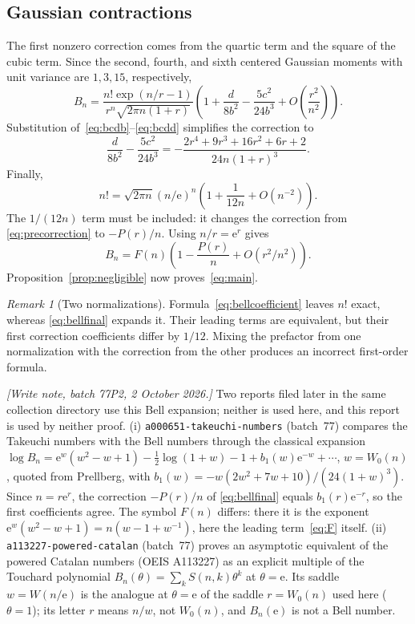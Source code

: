 \documentclass[11pt,a4paper]{article}
\numberwithin{equation}{section}
\theoremstyle{remark}
\newtheorem{remark}[theorem]{Remark}
\newcommand{\e}{\mathrm e}
\begin{document}
\subsection{Gaussian contractions}
The first nonzero correction comes from the quartic term and the square
of the cubic term. Since the second, fourth, and sixth centered Gaussian
moments with unit variance are $1,3,15$, respectively,
\begin{equation}\label{eq:bellcoefficient}
 B_n=\frac{n!\exp(n/r-1)}{r^n\sqrt{2\pi n(1+r)}}
 \left(1+\frac d{8b^2}-\frac{5c^2}{24b^3}
       +O\!\left(\frac{r^2}{n^2}\right)\right).
\end{equation}
Substitution of~\eqref{eq:bcdb}--\eqref{eq:bcdd} simplifies the correction to
\begin{equation}\label{eq:precorrection}
 \frac d{8b^2}-\frac{5c^2}{24b^3}
 =-\frac{2r^4+9r^3+16r^2+6r+2}{24n(1+r)^3}.
\end{equation}
Finally,
\[
 n!=\sqrt{2\pi n}(n/\e)^n
       \left(1+\frac1{12n}+O(n^{-2})\right).
\]
The $1/(12n)$ term must be included: it changes the correction from
\eqref{eq:precorrection} to $-P(r)/n$. Using $n/r=\e^r$ gives
\begin{equation}\label{eq:bellfinal}
 B_n=F(n)\left(1-\frac{P(r)}n+O(r^2/n^2)\right).
\end{equation}
Proposition~\ref{prop:negligible} now proves~\eqref{eq:main}.

\begin{remark}[Two normalizations]
Formula~\eqref{eq:bellcoefficient} leaves $n!$ exact, whereas
\eqref{eq:bellfinal} expands it. Their leading terms are equivalent, but
their first correction coefficients differ by $1/12$. Mixing the
prefactor from one normalization with the correction from the other
produces an incorrect first-order formula.
\end{remark}

\emph{[Write note, batch 77P2, 2 October 2026.]} Two reports filed later in
the same collection directory use this Bell expansion; neither is used here,
and this report is used by neither proof.
(i) \texttt{a000651-takeuchi-numbers} (batch~77) compares the Takeuchi
numbers with the Bell numbers through the classical expansion
$\log B_n=\e^w(w^2-w+1)-\tfrac12\log(1+w)-1+b_1(w)\e^{-w}+\cdots$,
$w=W_0(n)$, quoted from Prellberg, with
$b_1(w)=-w(2w^2+7w+10)/(24(1+w)^3)$. Since $n=r\e^r$, the correction
$-P(r)/n$ of \eqref{eq:bellfinal} equals $b_1(r)\e^{-r}$, so the first
coefficients agree. The symbol $F(n)$ differs: there it is the exponent
$\e^w(w^2-w+1)=n(w-1+w^{-1})$, here the leading term~\eqref{eq:F} itself.
(ii) \texttt{a113227-powered-catalan} (batch~77) proves an asymptotic
equivalent of the powered Catalan numbers (OEIS A113227) as an explicit
multiple of the Touchard polynomial $B_n(\theta)=\sum_kS(n,k)\theta^k$ at
$\theta=\e$. Its saddle $w=W(n/\e)$ is the analogue at $\theta=\e$ of the
saddle $r=W_0(n)$ used here ($\theta=1$); its letter $r$ means $n/w$, not
$W_0(n)$, and $B_n(\e)$ is not a Bell number.
\end{document}
